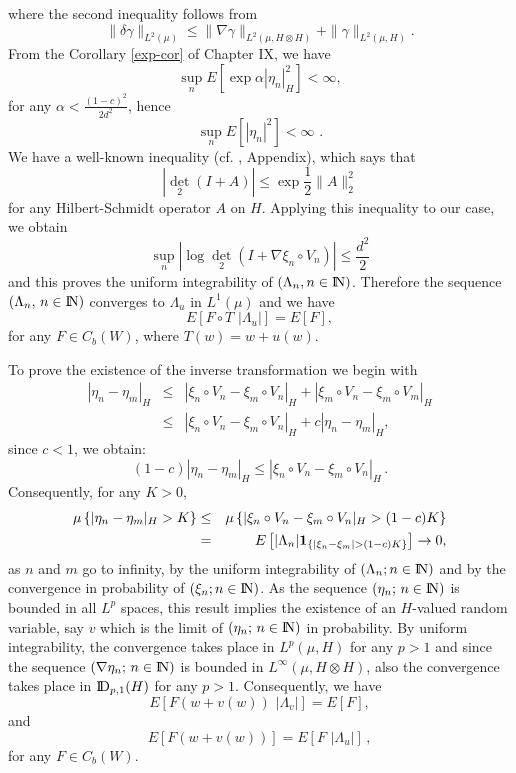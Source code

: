 \documentclass[12pt,a4paper]{book}
\newcommand{\La}{\Lambda}
\newcommand{\NN}{{\rm I\!N}}
\newcommand{\DD}{{\rm I\!D}}
\newcommand{\N}{{\rm I\!N}}
\newcommand{\dett}{{\textstyle{\det_2}}}
\newcommand{\won}{{\mbox{\bf 1}}}
\begin{document}
where the second inequality follows from
$$
\|\delta \gamma\|_{L^2(\mu)}\leq \|\nabla\gamma\|_{L^2(\mu,H\otimes H)}+
               \|\gamma\|_{L^2(\mu,H)}.
$$
From the Corollary \ref{exp-cor} of Chapter IX, we have
$$
\sup_n E\left[\exp \alpha |\eta_n|_H^2\right]<\infty,
$$
for any $\alpha<\frac{(1-c)^2}{2d^2}$, hence
$$
\sup_n E[|\eta_n|^2]<\infty\,\,.
$$
We have a well-known inequality (cf. \cite{UZ7}, Appendix), which says that
$$
|\dett(I+A)|\leq \exp \frac{1}{2}\|A\|^2_2
$$
for any Hilbert-Schmidt operator $A$ on $H$. Applying this inequality
to our case, we obtain
$$
\sup_n\left|\log \dett(I+\nabla \xi_n\circ V_n)\right|\leq \frac{d^2}{2}
$$
and this proves the uniform integrability of $(\La_n,n\in \NN)$.
Therefore the sequence  $(\Lambda_n,\,n\in \N)$
converges to $\Lambda_u$ in $L^1(\mu)$ and  we have
$$
E[F\circ T\,\,|\Lambda_u|]=E[F],
$$
for any $F\in C_b(W)$, where $T(w)=w+u(w)$.

To prove  the existence  of the inverse transformation  we begin with
\begin{eqnarray*}
\left|\eta_n-\eta_m\right|_H&\leq &\left|\xi_n\circ V_n-\xi_m\circ
  V_n\right|_H+ \left|\xi_m\circ V_n-\xi_m\circ V_m\right|_H\\
&\leq &\left|\xi_n\circ V_n-\xi_m\circ
  V_n\right|_H+c\left|\eta_n-\eta_m\right|_H,
\end{eqnarray*}
since $c <1$, we obtain:
$$
(1-c)|\eta_n-\eta_m|_H\leq |\xi_n\circ V_n-\xi_m\circ V_n|_H\,.
$$
Consequently, for any $K>0$,
\begin{eqnarray*}
\mu\left\{|\eta_n-\eta_m|_H>K\right\}&\leq & \mu\left\{|\xi_n\circ V_n-\xi_m\circ V_n|_H>(1-c)K\right\}\\
         &=& E\left[|\Lambda_n|\won_{\{|\xi_n-\xi_m|>(1-c)K\}}\right]
     \rightarrow 0,
\end{eqnarray*}
as $n$ and $m$ go to infinity, by the uniform integrability of
$(\Lambda_n;n\in \N)$ and by the convergence in probability of
$(\xi_n; n\in \N)$. As the sequence $(\eta_n;\,n\in\N)$ is bounded in all
$L^p$ spaces, this result implies the existence of an $H$-valued
random variable, say $v$ which is the limit of $(\eta_n;\,n\in\N)$ in
probability.
By uniform integrability, the convergence takes place in $L^p(\mu,H)$ for any
$p>1$ and since the sequence $(\nabla \eta_n;\,n\in \N)$ is bounded in
$L^\infty(\mu,H\otimes H)$, also the convergence takes place in $\DD_{p,1}(H)$
for any $p>1$. Consequently, we have
$$
E[F(w+v(w))\,\,|\Lambda_v|]=E[F],
$$
and
$$
E[F(w+v(w))]=E[F\,\,|\Lambda_u|]\,,
$$
for any $F\in C_b(W)$.
\end{document}
